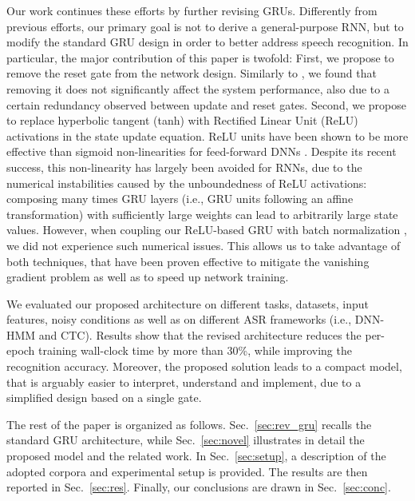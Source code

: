\documentclass[journal]{IEEEtran}
\begin{document}
Our work continues these efforts by further revising GRUs. %
Differently from previous efforts, our primary goal is not to derive a general-purpose RNN, but to modify the standard GRU design in order to better address speech recognition.
In particular, the major contribution of this paper is twofold: First, we propose to remove the reset gate from the network design. Similarly to \cite{mgru}, we found that removing it does not significantly affect the system performance, also due to a certain redundancy observed between update and reset gates.
Second, we propose to replace hyperbolic tangent (tanh) with Rectified Linear Unit (ReLU) activations \cite{relu} in the state update equation. 
ReLU units have been shown to be more effective than sigmoid non-linearities for feed-forward DNNs \cite{krizhevsky2012imagenet,dahl2012context}.
Despite its recent success, this non-linearity has largely been avoided for RNNs, due to the numerical instabilities caused by the unboundedness of ReLU activations: composing many times GRU layers (i.e., GRU units following an affine transformation) with sufficiently large weights can lead to arbitrarily large state values. However, when coupling our ReLU-based GRU with batch normalization \cite{batchnorm}, we did not experience such numerical issues. This allows us to take advantage of both techniques, that have been proven effective to mitigate the vanishing gradient problem as well as to speed up network training.    

We evaluated our proposed architecture on different tasks, datasets, input features, noisy conditions as well as on different ASR frameworks (i.e., DNN-HMM and CTC). Results show that the revised architecture reduces the per-epoch training wall-clock time by more than 30\%, while improving the recognition accuracy.  Moreover, the proposed solution leads to a compact model, that is arguably easier to interpret, understand and implement, due to a simplified design based on a single gate. %

The rest of the paper is organized as follows. Sec.~\ref{sec:rev_gru} recalls the standard GRU architecture, while Sec.~\ref{sec:novel} illustrates in detail the proposed model and the related work.
In Sec.~\ref{sec:setup}, a description of the adopted corpora and experimental setup is provided. The results are then reported in Sec.~\ref{sec:res}. Finally, our conclusions are drawn in Sec.~\ref{sec:conc}.
\end{document}
